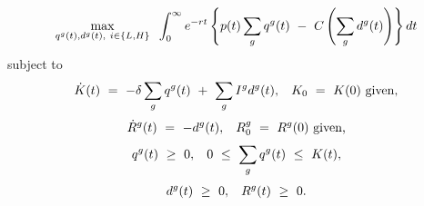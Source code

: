 \begin{equation}
\begin{split}
    \underset{q^{g}(t), d^{g}(t), \ i \in \{L, H\}}{\max} \hspace{0.2cm} \int_{0}^{\infty} e^{-rt} \left\{ p(t) \sum_{g} q^{g}(t) \ - \ C\left( \sum_{g} d^{g}(t) \right) \right\} dt
\end{split}
\label{Equation:AKS-Style-Model_Objective-Function}
\end{equation}
subject to
\begin{equation}
\begin{split}
    \dot{K}(t) \ = \ - \delta \sum_{g} q^{g}(t) \ + \ \sum_{g} I^{g} d^{g}(t), \hspace{0.3cm} K_{0} \ = \ K(0) \ \text{given,}
\end{split}
\end{equation}
\begin{equation}
\begin{split}
    \dot{R}^{g}(t) \ = \ - d^{g}(t), \hspace{0.3cm} R_{0}^{g} \ = \ R^{g}(0) \ \text{given,} 
\end{split}
\end{equation}
\begin{equation}
\begin{split}
    q^{g}(t) \ \geq \ 0, \hspace{0.3cm} 0 \ \leq \ \sum_{g} q^{g}(t) \ \leq \ K(t),
\end{split}
\end{equation}
\begin{equation}
\begin{split}
    d^{g}(t) \ \geq \ 0, \hspace{0.3cm} R^{g}(t) \ \geq \ 0.
\end{split}
\end{equation}
